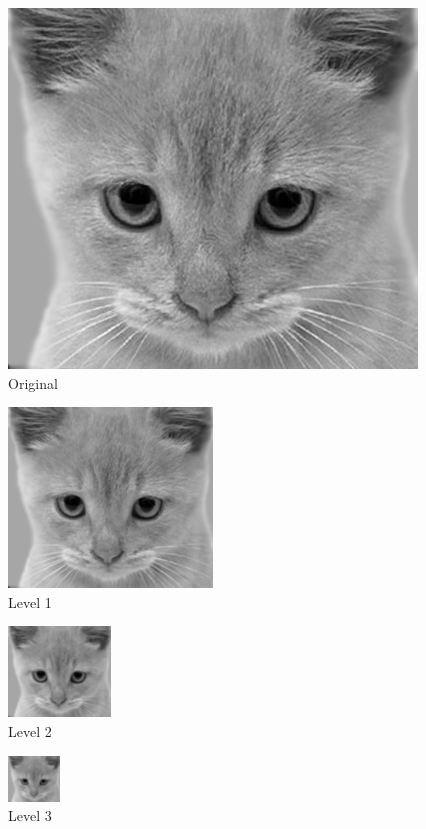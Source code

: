 \documentclass{article}
\begin{document}
\begin{figure}[H]
\centering
\includegraphics[scale=1]{Ejercicio2d/cat0.png}
\caption{Original}
\end{figure}

\begin{figure}[H]
\centering
\includegraphics[scale=1]{Ejercicio2d/cat1.png}
\caption{Level 1}
\end{figure}

\begin{figure}[H]
\centering
\includegraphics[scale=1]{Ejercicio2d/cat2.png}
\caption{Level 2}
\end{figure}

\begin{figure}[H]
\centering
\includegraphics[scale=1]{Ejercicio2d/cat3.png}
\caption{Level 3}
\end{figure}
\end{document}

